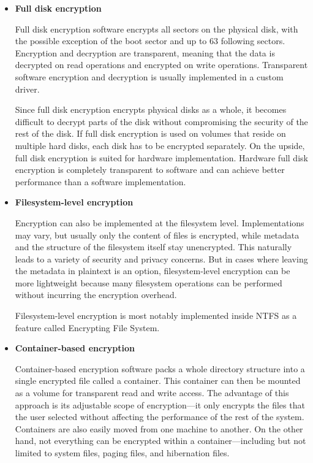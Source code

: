 \documentclass[thesis=B,english]{FITthesis}[2012/10/20]
\begin{document}
	\begin{itemize}
		\item \textbf{Full disk encryption}
		
		Full disk encryption software encrypts all sectors on the physical disk, with the possible exception of the boot sector and up to 63 following sectors. Encryption and decryption are transparent, meaning that the data is decrypted on read operations and encrypted on write operations. Transparent software encryption and decryption is usually implemented in a custom driver.
		
		
		Since full disk encryption encrypts physical disks as a whole, it becomes difficult to decrypt parts of the disk without compromising the security of the rest of the disk. If full disk encryption is used on volumes that reside on multiple hard disks, each disk has to be  encrypted separately. On the upside, full disk encryption is suited for hardware implementation. Hardware full disk encryption is completely transparent to software and can achieve better performance than a software implementation.
		
		
		\item \textbf{Filesystem-level encryption}
		
		Encryption can also be implemented at the filesystem level. Implementations may vary, but usually only the content of files is encrypted, while metadata and the structure of the filesystem itself stay unencrypted. This naturally leads to a variety of security and privacy concerns. But in cases where leaving the metadata in plaintext is an option, filesystem-level encryption can be more lightweight because many filesystem operations can be performed without incurring the encryption overhead.
		
		Filesystem-level encryption is most notably implemented inside NTFS as a feature called Encrypting File System.
		
		\item \textbf{Container-based encryption}
		
		Container-based encryption software packs a whole directory structure into a single encrypted file called a container. This container can then be mounted as a volume for transparent read and write access. The advantage of this approach is its adjustable scope of encryption---it only encrypts the files that the user selected without affecting the performance of the rest of the system. Containers are also easily moved from one machine to another. On the other hand, not everything can be encrypted within a container---including but not limited to system files, paging files, and hibernation files.
		

\end{itemize}
\end{document}
